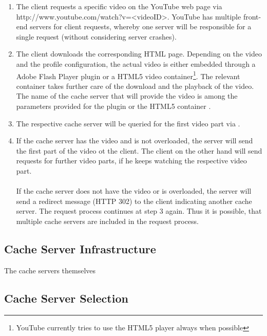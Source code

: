 \begin{enumerate}
  \item The client requests a specific video on the YouTube web page via http://www.youtube.com/watch?v=<videoID>. YouTube has multiple front-end servers for client requests, whereby one server will be responsible for a single request (without considering server crashes).
  
  \item The client downloads the corresponding HTML page. Depending on the video and the profile configuration, the actual video is either embedded through a Adobe Flash Player plugin or a HTML5 video container\footnote{YouTube currently tries to use the HTML5 player always when possible\cite{misc:youtube_html5}}. The relevant container takes further care of the download and the playback of the video. The name of the cache server that will provide the video is among the parameters provided for the plugin or the HTML5 container \cite{inpr:server_selection}.
  
  \item The respective cache server will be queried for the first video part via . 

  \item If the cache server has the video and is not overloaded, the server will send the first part of the video ot the client. The client on the other hand will send requests for further video parts, if he keeps watching the respective video part. \\
\\
If the cache server does not have the video or is overloaded, the server will send a redirect message (HTTP 302) to the client indicating another cache server. The request process continues at step 3 again. Thus it is possible, that multiple cache servers are included in the request process.

\end{enumerate}

\subsection{Cache Server Infrastructure}

The cache servers themselves

\subsection{Cache Server Selection}
\label{subs:cache_server_selection}
